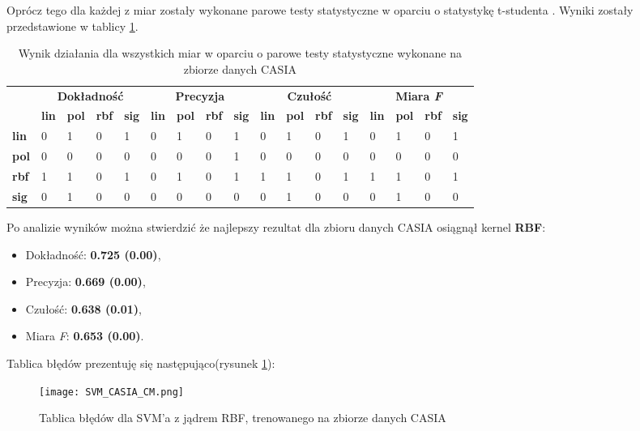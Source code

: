 Oprócz tego dla każdej z miar zostały wykonane parowe testy statystyczne w oparciu o statystykę t-studenta \cite{stata}. Wyniki zostały przedstawione w tablicy \ref{tab:result_c}.

\begin{table}[h!]
	\centering
	\begin{tabular}{l|l|l|l|l|l|l|l|l|l|l|l|l|l|l|l|l|}
		\cline{2-17}
		&
		\multicolumn{4}{c|}{\textbf{Dokładność}} &
		\multicolumn{4}{c|}{\textbf{Precyzja}} &
		\multicolumn{4}{c|}{\textbf{Czułość}} &
		\multicolumn{4}{c|}{\textbf{Miara \textit{F}}} \\ \cline{2-17} 
		\textbf{} &
		\textbf{lin} &
		\textbf{pol} &
		\textbf{rbf} &
		\textbf{sig} &
		\textbf{lin} &
		\textbf{pol} &
		\textbf{rbf} &
		\textbf{sig} &
		\textbf{lin} &
		\textbf{pol} &
		\textbf{rbf} &
		\textbf{sig} &
		\textbf{lin} &
		\textbf{pol} &
		\textbf{rbf} &
		\textbf{sig} \\ \hline
		\multicolumn{1}{|l|}{\textbf{lin}}  & 0 & 1 & 0 & 1 & 0 & 1 & 0 & 1 & 0 & 1 & 0 & 1 & 0 & 1 & 0 & 1 \\ \hline
		\multicolumn{1}{|l|}{\textbf{pol}}    & 0 & 0 & 0 & 0 & 0 & 0 & 0 & 1 & 0 & 0 & 0 & 0 & 0 & 0 & 0 & 0 \\ \hline
		\multicolumn{1}{|l|}{\textbf{rbf}}     & 1 & 1 & 0 & 1 & 0 & 1 & 0 & 1 & 1 & 1 & 0 & 1 & 1 & 1 & 0 & 1 \\ \hline
		\multicolumn{1}{|l|}{\textbf{sig}} & 0 & 1 & 0 & 0 & 0 & 0 & 0 & 0 & 0 & 1 & 0 & 0 & 0 & 1 & 0 & 0 \\ \hline
	\end{tabular}
	\caption{Wynik działania dla wszystkich miar w oparciu o parowe testy statystyczne wykonane na zbiorze danych CASIA }
	\label{tab:result_c}
\end{table}

Po analizie wyników można stwierdzić że najlepszy rezultat dla zbioru danych CASIA osiągnął kernel \textbf{RBF}:
\begin{itemize}
	\item Dokładność: \textbf{0.725 (0.00)},
	\item Precyzja: \textbf{0.669 (0.00)},
	\item Czułość: \textbf{0.638 (0.01)},
	\item Miara \textit{F}: \textbf{0.653 (0.00)}. \\
\end{itemize}
Tablica błędów prezentuję się następująco(rysunek \ref{fig:rbf_cm_casia}):

\begin{figure}[h!]
	\texttt{[image: SVM\_CASIA\_CM.png]}
	\centering
	\caption{Tablica błędów dla SVM'a z jądrem RBF, trenowanego na zbiorze danych CASIA}
	\label{fig:rbf_cm_casia}
\end{figure}

